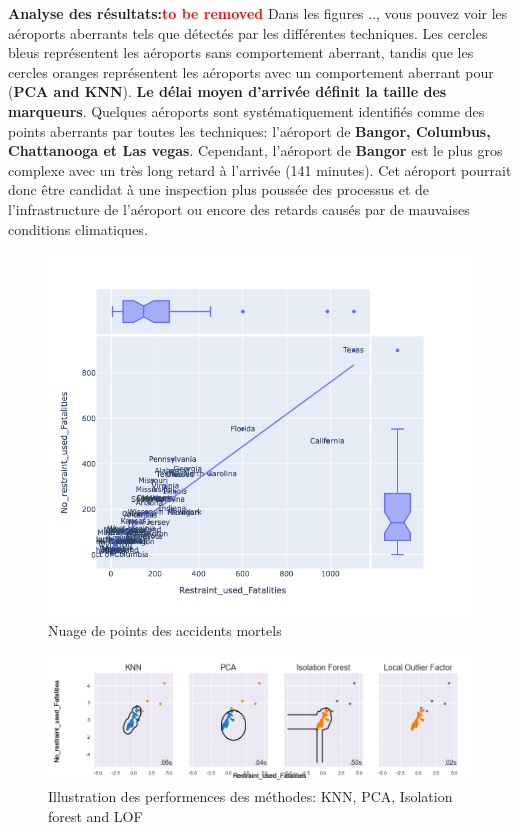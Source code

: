 \noindent\textbf{Analyse des résultats:\textcolor{red}{to be removed}} 
Dans les figures .., vous pouvez voir les aéroports aberrants tels que détectés par les différentes techniques. Les cercles bleus représentent les aéroports sans comportement aberrant, tandis que les cercles oranges représentent les aéroports avec un comportement aberrant pour (\textbf{PCA and KNN}). \textbf{Le délai moyen d'arrivée définit la taille des marqueurs}. Quelques aéroports sont systématiquement identifiés comme des points aberrants par toutes les techniques: l’aéroport de \textbf{Bangor, Columbus, Chattanooga et Las vegas}. Cependant, l’aéroport de \textbf{Bangor} est le plus gros complexe avec un très long retard à l’arrivée (141 minutes). Cet aéroport pourrait donc être candidat à une inspection plus poussée des processus et de l’infrastructure de l’aéroport ou encore des retards causés par de mauvaises conditions climatiques.
 \begin{figure}[ht]
    \centering
    \includegraphics[width=.50\textwidth]{ADOA/Images/Fatal1.png}
    \caption{Nuage de points des accidents mortels}%
    \label{fig2a}
\end{figure}

 \begin{figure}[ht]
    \centering
    \includegraphics[width=1\textwidth]{ADOA/Images/Fatal11.png}
    \caption{Illustration des performences des méthodes: KNN, PCA, Isolation forest and LOF}%
    \label{fig3}
\end{figure}
\vspace{2cm}

